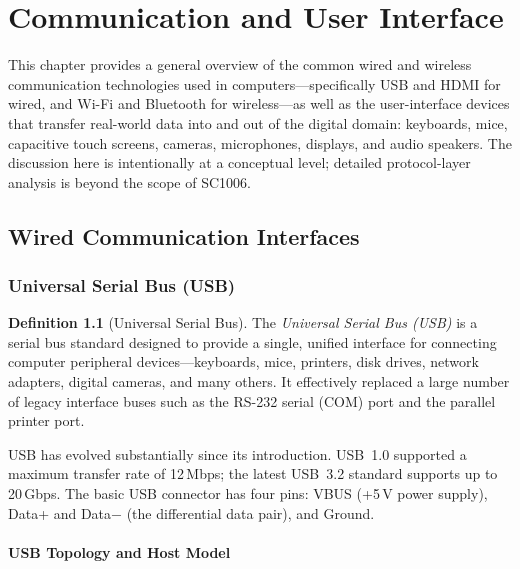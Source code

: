\documentclass[11pt, a4paper, notitlepage]{report}
\theoremstyle{definition}
\newtheorem{definition}[theorem]{Definition}
\theoremstyle{remark}
\theoremstyle{definition}
\begin{document}
\chapter{Communication and User Interface}
\label{chap:comm-ui}

This chapter provides a general overview of the common wired and wireless communication technologies used in computers---specifically USB and HDMI for wired, and Wi-Fi and Bluetooth for wireless---as well as the user-interface devices that transfer real-world data into and out of the digital domain: keyboards, mice, capacitive touch screens, cameras, microphones, displays, and audio speakers. The discussion here is intentionally at a conceptual level; detailed protocol-layer analysis is beyond the scope of SC1006.

\section{Wired Communication Interfaces}
\label{sec:wired-comm}

\subsection{Universal Serial Bus (USB)}
\label{sec:usb}

\begin{definition}[Universal Serial Bus]
  \label{def:usb}
  The \emph{Universal Serial Bus (USB)} is a serial bus standard designed to provide a single, unified interface for connecting computer peripheral devices---keyboards, mice, printers, disk drives, network adapters, digital cameras, and many others. It effectively replaced a large number of legacy interface buses such as the RS-232 serial (COM) port and the parallel printer port.
\end{definition}

USB has evolved substantially since its introduction. USB~1.0 supported a maximum transfer rate of 12\,Mbps; the latest USB~3.2 standard supports up to 20\,Gbps. The basic USB connector has four pins: VBUS (+5\,V power supply), Data+ and Data$-$ (the differential data pair), and Ground.

\subsubsection{USB Topology and Host Model}
\end{document}
